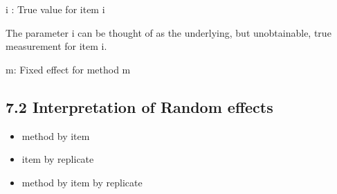 \documentclass[Chap4bmain.tex]{subfiles}
\begin{document}
i : True value for item i

The parameter i can be thought of as the underlying, but unobtainable, true measurement for item i.

m: Fixed effect for method m


\subsection{7.2 Interpretation of Random effects}

\begin{itemize}
\item method by item
\item item by replicate
\item method by item by replicate
\end{itemize}
\end{document}
